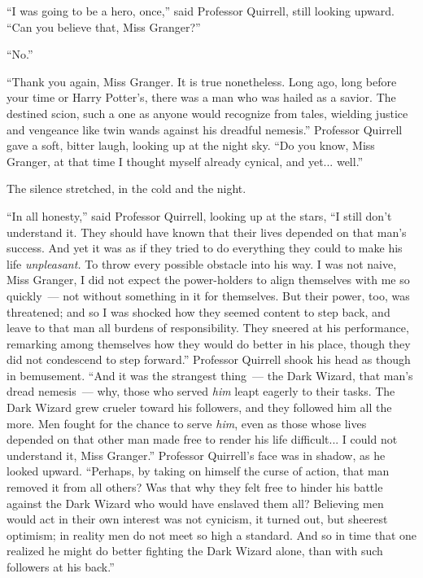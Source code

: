 ``I was going to be a hero, once,'' said Professor Quirrell, still looking upward. ``Can you believe that, Miss Granger?''

``No.''

``Thank you again, Miss Granger. It is true nonetheless. Long ago, long before your time or Harry Potter's, there was a man who was hailed as a savior. The destined scion, such a one as anyone would recognize from tales, wielding justice and vengeance like twin wands against his dreadful nemesis.'' Professor Quirrell gave a soft, bitter laugh, looking up at the night sky. ``Do you know, Miss Granger, at that time I thought myself already cynical, and yet... well.''

The silence stretched, in the cold and the night.

``In all honesty,'' said Professor Quirrell, looking up at the stars, ``I still don't understand it. They should have known that their lives depended on that man's success. And yet it was as if they tried to do everything they could to make his life \emph{unpleasant.} To throw every possible obstacle into his way. I was not naive, Miss Granger, I did not expect the power-holders to align themselves with me so quickly~--- not without something in it for themselves. But their power, too, was threatened; and so I was shocked how they seemed content to step back, and leave to that man all burdens of responsibility. They sneered at his performance, remarking among themselves how they would do better in his place, though they did not condescend to step forward.'' Professor Quirrell shook his head as though in bemusement. ``And it was the strangest thing~--- the Dark Wizard, that man's dread nemesis~--- why, those who served \emph{him} leapt eagerly to their tasks. The Dark Wizard grew crueler toward his followers, and they followed him all the more. Men fought for the chance to serve \emph{him}, even as those whose lives depended on that other man made free to render his life difficult... I could not understand it, Miss Granger.'' Professor Quirrell's face was in shadow, as he looked upward. ``Perhaps, by taking on himself the curse of action, that man removed it from all others? Was that why they felt free to hinder his battle against the Dark Wizard who would have enslaved them all? Believing men would act in their own interest was not cynicism, it turned out, but sheerest optimism; in reality men do not meet so high a standard. And so in time that one realized he might do better fighting the Dark Wizard alone, than with such followers at his back.''

